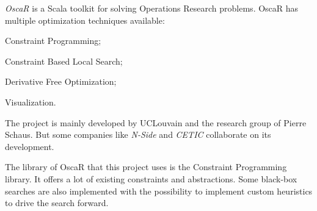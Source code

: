 \documentclass[../../thesis.tex]{subfiles}
\begin{document}
\emph{OscaR} \cite{oscar} is a Scala toolkit for solving Operations Research problems. 
OscaR has multiple optimization techniques available:
\begin{enumerate*}[label=(\roman*)]
  \item Constraint Programming;
  \item Constraint Based Local Search;
  \item Derivative Free Optimization;
  \item Visualization.
\end{enumerate*}


The project is mainly developed by UCLouvain and the research group of Pierre Schaus. 
But some companies like \emph{N-Side} and \emph{CETIC} collaborate on its development.

The library of OscaR that this project uses is the Constraint Programming library. 
It offers a lot of existing constraints and abstractions. Some black-box searches are also 
implemented with the possibility to implement custom heuristics to drive the search forward.
\end{document}
